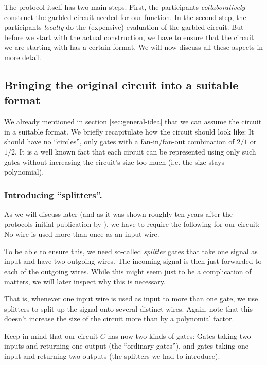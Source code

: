 \message{ !name(seminar.tex)}\documentclass{llncs}
\begin{document}
The protocol itself has two main steps. First, the participants \emph{collaboratively} construct the garbled circuit needed for our function. In the second step, the participants \emph{locally} do the (expensive) evaluation of the garbled circuit. But before we start with the actual construction, we have to ensure that the circuit we are starting with has a certain format. We will now discuss all these aspects in more detail.

\subsection{Bringing the original circuit into a suitable format}
\label{sec:original-circuit-suitable-format}

We already mentioned in section \ref{sec:general-idea} that we can assume the circuit in a suitable format. We briefly recapitulate how the circuit should look like: It should have no ``circles'', only gates with a fan-in/fan-out combination of $2/1$ or $1/2$. It is a well known fact that each circuit can be represented using only such gates without increasing the circuit's size too much (i.e. the size stays polynomial).

\subsubsection{Introducing ``splitters''.}
\label{sec:introducing-splitters}

As we will discuss later (and as it was shown roughly ten years after the protocols initial publication by \cite{Tate03ongarbled}), we have to require the following for our circuit: No wire is used more than once as an input wire.

To be able to ensure this, we need so-called \emph{splitter} gates that take one signal as input and have two outgoing wires. The incoming signal is then just forwarded to each of the outgoing wires. While this might seem just to be a complication of matters, we will later inspect why this is necessary.

That is, whenever one input wire is used as input to more than one gate, we use splitters to split up the signal onto several distinct wires. Again, note that this doesn't increase the size of the circuit more than by a polynomial factor.

Keep in mind that our circuit $C$ has now two kinds of gates: Gates taking two inputs and returning one output (the ``ordinary gates''), and gates taking one input and returning two outputs (the splitters we had to introduce).
\end{document}
